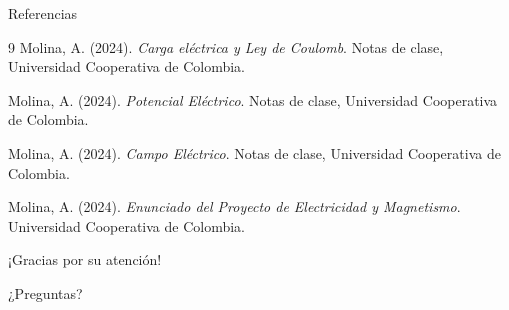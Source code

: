 \documentclass[10pt, aspectratio=169]{beamer}
\begin{document}
\begin{frame}{Referencias}
  \begin{thebibliography}{9}
      Molina, A. (2024).
      \emph{Carga eléctrica y Ley de Coulomb}.
      Notas de clase, Universidad Cooperativa de Colombia.

      Molina, A. (2024).
      \emph{Potencial Eléctrico}.
      Notas de clase, Universidad Cooperativa de Colombia.

      Molina, A. (2024).
      \emph{Campo Eléctrico}.
      Notas de clase, Universidad Cooperativa de Colombia.

      Molina, A. (2024).
      \emph{Enunciado del Proyecto de Electricidad y Magnetismo}.
      Universidad Cooperativa de Colombia.
  \end{thebibliography}
\end{frame}


\begin{frame}[plain]
  \centering
  \Huge \textcolor{UCCAzul}{¡Gracias por su atención!}

  \vspace{2em}

  \Large ¿Preguntas?
\end{frame}

\end{document}
